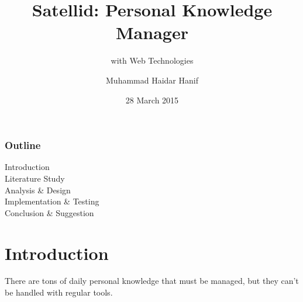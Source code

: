 \documentclass[10pt, compress]{beamer}
\title{Satellid: Personal Knowledge Manager}
\subtitle{with Web Technologies}
\date{28 March 2015}
\author{Muhammad Haidar Hanif}
\institute{Informatics Engineering - Gunadarma University}
\begin{document}

\maketitle


\begin{frame}[fragile]
  \frametitle{Outline}

  \begin{description}
    \item[Introduction]
    \item[Literature Study]
    \item[Analysis \& Design]
    \item[Implementation \& Testing]
    \item[Conclusion \& Suggestion]
  \end{description}

\end{frame}


\section{Introduction}


\begin{frame}[fragile]

  \begin{center}
  There are tons of \alert{daily personal knowledge} that must be managed,
  but they can't be handled with regular tools.
  \end{center}

\end{frame}

\end{document}
